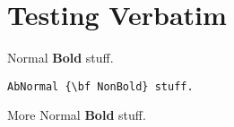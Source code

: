 \documentclass{article}
\begin{document}
\section{Testing Verbatim}
Normal {\bf Bold} stuff.
\begin{verbatim}
AbNormal {\bf NonBold} stuff.
\end{verbatim}
More Normal {\bf Bold} stuff.
\end{document}

